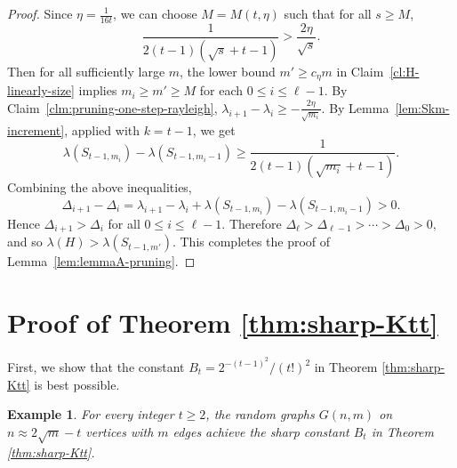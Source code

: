 \documentclass[10pt,a4paper]{amsart}
\newtheorem{example}[theorem]{Example}
\begin{document}
\begin{proof}
Since $\eta= \frac{1}{16t}$, we can choose $M=M(t,\eta)$ such that for all \(s\ge M\),
\[
\frac{1}{2(t-1)(\sqrt s+t-1)} > \frac{2\eta}{\sqrt s}.
\]
Then for all sufficiently large $m$, the lower bound $m'\ge c_\eta m$ in Claim~\ref{cl:H-linearly-size} implies $m_i\ge m'\ge M$ for each $0\le i\le \ell-1$. 
By Claim~\ref{clm:pruning-one-step-rayleigh}, $\lambda_{i+1} - \lambda_i \ge -\frac{2\eta}{\sqrt{m_i}}.$
By Lemma~\ref{lem:Skm-increment}, applied with \(k=t-1\), we get
\[
  \lambda(S_{t-1,m_i})-
  \lambda(S_{t-1,m_i-1})
  \ge
  \frac{1}{2(t-1)(\sqrt{m_i}+t-1)}.
\]
Combining the above inequalities,
\[
  \Delta_{i+1} - \Delta_i
  =
  \lambda_{i+1} - \lambda_i
  +
  \lambda(S_{t-1,m_i})
  -
  \lambda(S_{t-1,m_i-1})
  >0.
\]
Hence $\Delta_{i+1}> \Delta_i$ for all \(0\le i\le \ell-1\). Therefore $\Delta_\ell>\Delta_{\ell-1}>\cdots>\Delta_0>0,$
and so $\lambda(H)>\lambda(S_{t-1,m'}).$
This completes the proof of Lemma~\ref{lem:lemmaA-pruning}.
\end{proof}



\section{Proof of Theorem \ref{thm:sharp-Ktt}} 

\label{sec-four-key-lemmas}

First, we show that the constant $B_t= 2^{-(t-1)^2}/(t!)^2$ in Theorem \ref{thm:sharp-Ktt} is best possible. 

\begin{example} \label{exam:sharpness-Bt}
For every integer $t\ge 2$, 
   the random graphs $G(n,m)$ on $n\approx 2\sqrt{m} - t$ vertices with $m$ edges achieve the sharp constant $B_t$ in Theorem \ref{thm:sharp-Ktt}. 
\end{example}
\end{document}
